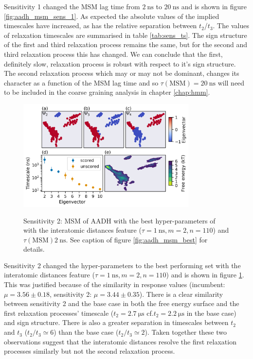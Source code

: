 Sensitivity 1 changed the MSM lag time from $\SI{2}{\nano\second}$ to $\SI{20}{\nano\second}$ and is shown in figure \ref{fig:aadh_msm_sens_1}. As expected the absolute values of the implied timescales have increased, as has the relative separation between $t_{2}$/$t_{3}$. The values of relaxation timescales are summarised in table \ref{tab:sens_ts}. The sign structure of the first and third relaxation process remains the same, but for the second and third relaxation process this has changed.  We can conclude that the first, definitely slow, relaxation process is robust with respect to it's sign structure. The second relaxation process which may or may not be dominant, changes its character as a function of the MSM lag time and so  $\tau(\mathrm{MSM}) = \SI{20}{\nano\second}$ will need to be included in the coarse graining analysis in chapter \ref{chap:hmm}. 

\begin{figure}
    \centering
    \caption{Sensitivity 2: MSM of AADH with the best hyper-parameters of with the interatomic distances feature ($\tau = \SI{1}{\nano\second}, m=2, n=110$) and $\tau(\mathrm{MSM}) \SI{2}{\nano\second}$. See caption of figure \ref{fig:aadh_msm_best} for details.}
    \includegraphics[width=0.8\textwidth]{chapters/msm_optimization/figures/aadh_msm_sens_2.png}
    \label{fig:aadh_msm_sens_2}
\end{figure}


Sensitivity 2 changed the hyper-parameters to the best performing set with the interatomic distances feature ($\tau = \SI{1}{\nano\second}, m=2, n=110$) and is shown in figure \ref{fig:aadh_msm_sens_2}.  This was justified because of the similarity in response values (incumbent: $\mu=3.56 \pm 0.18$, sensitivity 2: $\mu=3.44 \pm 0.35$). There is a clear similarity between sensitivity 2 and the base case in both the free energy surface and the first relaxation processes' timescale ($t_{2} = \SI{2.7}{\micro\second}$ cf.$t_{2} = \SI{2.2}{\micro\second}$ in the base case) and sign structure.  There is also a greater separation in timescales between $t_{2}$ and $t_{3}$ ($t_{2}/t_{3} \simeq 6$) than the base case ($t_{2}/t_{3} \simeq 2$). Taken together these two observations suggest that the interatomic distances resolve the first relaxation processes similarly but not the second relaxation process. 


